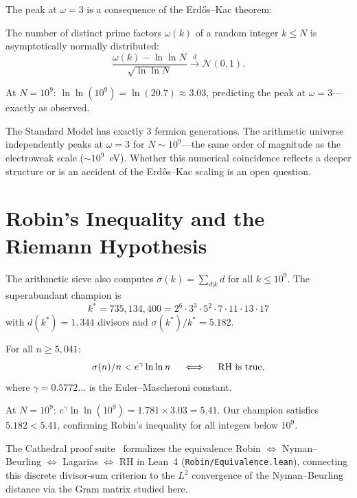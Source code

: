 \documentclass[11pt,a4paper]{article}
\begin{document}
The peak at $\omega = 3$ is a consequence of the Erd\H{o}s--Kac theorem:
\begin{theorem}
The number of distinct prime factors $\omega(k)$ of a random integer
$k \leq N$ is asymptotically normally distributed:
\[
  \frac{\omega(k) - \ln\ln N}{\sqrt{\ln\ln N}} \xrightarrow{d} \mathcal{N}(0,1).
\]
\end{theorem}

At $N = 10^9$: $\ln\ln(10^9) = \ln(20.7) \approx 3.03$, predicting
the peak at $\omega = 3$---exactly as observed.

\begin{remark}
The Standard Model has exactly 3 fermion generations. The arithmetic
universe independently peaks at $\omega = 3$ for $N \sim 10^9$---the
same order of magnitude as the electroweak scale ($\sim 10^9$~eV).
Whether this numerical coincidence reflects a deeper structure or is
an accident of the Erd\H{o}s--Kac scaling is an open question.
\end{remark}

\section{Robin's Inequality and the Riemann Hypothesis}
\label{sec:robin}

The arithmetic sieve also computes $\sigma(k) = \sum_{d | k} d$ for
all $k \leq 10^9$. The superabundant champion is
\[
  k^* = 735{,}134{,}400 = 2^6 \cdot 3^3 \cdot 5^2 \cdot 7 \cdot 11 \cdot 13 \cdot 17
\]
with $d(k^*) = 1{,}344$ divisors and $\sigma(k^*)/k^* = 5.182$.

\begin{theorem}[Robin, 1984]
For all $n \geq 5{,}041$:
\[
  \sigma(n)/n < e^\gamma \ln\ln n \quad \iff \quad \mathrm{RH} \text{ is true},
\]
where $\gamma = 0.5772\ldots$ is the Euler--Mascheroni constant.
\end{theorem}

At $N = 10^9$: $e^\gamma \ln\ln(10^9) = 1.781 \times 3.03 = 5.41$.
Our champion satisfies $5.182 < 5.41$, confirming Robin's inequality
for all integers below $10^9$.

\begin{remark}
The Cathedral proof suite~\cite{cathedral-physics} formalizes the
equivalence Robin $\iff$ Nyman--Beurling $\iff$ Lagarias $\iff$ RH
in Lean~4 (\texttt{Robin/Equivalence.lean}), connecting this
discrete divisor-sum criterion to the $L^2$ convergence of the
Nyman--Beurling distance via the Gram matrix studied here.
\end{remark}
\end{document}
